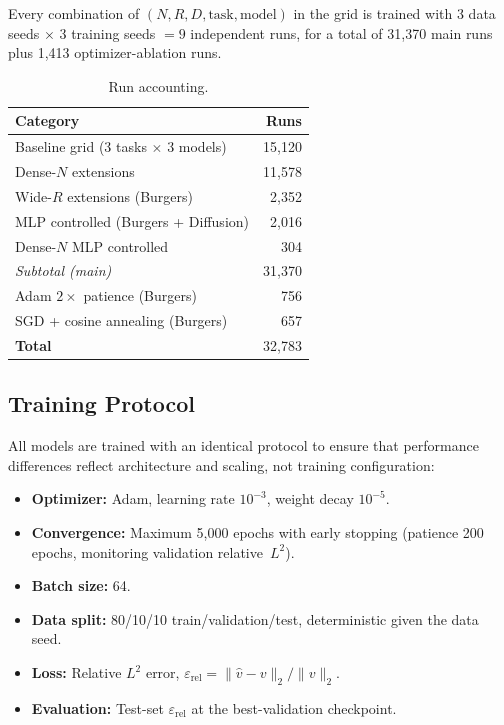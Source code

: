 \documentclass[11pt]{article}
\newcommand{\relLtwo}{\varepsilon_{\mathrm{rel}}}
\newcommand{\totalRuns}{32{,}783}
\newcommand{\mainRuns}{31{,}370}
\newcommand{\ablationRuns}{1{,}413}
\begin{document}
Every combination of $(N, R, D, \text{task}, \text{model})$ in the
grid is trained with 3 data seeds $\times$ 3 training seeds $= 9$
independent runs, for a total of \mainRuns{} main runs plus
\ablationRuns{} optimizer-ablation runs.

\begin{table}[h]
\centering
\caption{Run accounting.}
\label{tab:run-accounting}
\begin{tabular}{@{}lr@{}}
\toprule
\textbf{Category} & \textbf{Runs} \\
\midrule
Baseline grid (3 tasks $\times$ 3 models) & 15{,}120 \\
Dense-$N$ extensions & 11{,}578 \\
Wide-$R$ extensions (Burgers) & 2{,}352 \\
MLP controlled (Burgers + Diffusion) & 2{,}016 \\
Dense-$N$ MLP controlled & 304 \\
\midrule
\emph{Subtotal (main)} & \mainRuns{} \\
\midrule
Adam $2\times$ patience (Burgers) & 756 \\
SGD + cosine annealing (Burgers) & 657 \\
\midrule
\textbf{Total} & \totalRuns{} \\
\bottomrule
\end{tabular}
\end{table}

\subsection{Training Protocol}
\label{sec:training}

All models are trained with an identical protocol to ensure that
performance differences reflect architecture and scaling, not training
configuration:

\begin{itemize}[leftmargin=*,itemsep=2pt]
  \item \textbf{Optimizer:} Adam, learning rate $10^{-3}$, weight
    decay $10^{-5}$.
  \item \textbf{Convergence:} Maximum 5{,}000 epochs with early
    stopping (patience 200 epochs, monitoring validation
    relative~$L^2$).
  \item \textbf{Batch size:} 64.
  \item \textbf{Data split:} 80/10/10 train/validation/test,
    deterministic given the data seed.
  \item \textbf{Loss:} Relative $L^2$ error,
    $\relLtwo = \|\hat{v} - v\|_2 / \|v\|_2$.
  \item \textbf{Evaluation:} Test-set $\relLtwo$ at the
    best-validation checkpoint.
\end{itemize}
\end{document}
